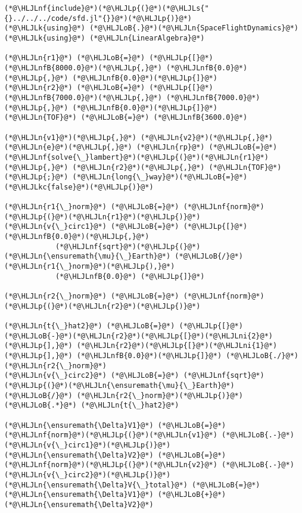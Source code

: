 \documentclass[12pt,a4paper]{article}
\newcommand{\HLJLk}[1]{\textcolor[RGB]{148,91,176}{\textbf{#1}}}
\newcommand{\HLJLkc}[1]{\textcolor[RGB]{59,151,46}{\textit{#1}}}
\newcommand{\HLJLn}[1]{#1}
\newcommand{\HLJLnf}[1]{\textcolor[RGB]{66,102,213}{#1}}
\newcommand{\HLJLs}[1]{\textcolor[RGB]{201,61,57}{#1}}
\newcommand{\HLJLnfB}[1]{\textcolor[RGB]{59,151,46}{#1}}
\newcommand{\HLJLni}[1]{\textcolor[RGB]{59,151,46}{#1}}
\newcommand{\HLJLoB}[1]{\textcolor[RGB]{102,102,102}{\textbf{#1}}}
\newcommand{\HLJLp}[1]{#1}
\begin{document}
\begin{lstlisting}
(*@\HLJLnf{include}@*)(*@\HLJLp{(}@*)(*@\HLJLs{"{}../../../code/sfd.jl"{}}@*)(*@\HLJLp{)}@*)
(*@\HLJLk{using}@*) (*@\HLJLoB{.}@*)(*@\HLJLn{SpaceFlightDynamics}@*)
(*@\HLJLk{using}@*) (*@\HLJLn{LinearAlgebra}@*)

(*@\HLJLn{r1}@*) (*@\HLJLoB{=}@*) (*@\HLJLp{[}@*)(*@\HLJLnfB{8000.0}@*)(*@\HLJLp{,}@*) (*@\HLJLnfB{0.0}@*)(*@\HLJLp{,}@*) (*@\HLJLnfB{0.0}@*)(*@\HLJLp{]}@*)
(*@\HLJLn{r2}@*) (*@\HLJLoB{=}@*) (*@\HLJLp{[}@*)(*@\HLJLnfB{7000.0}@*)(*@\HLJLp{,}@*) (*@\HLJLnfB{7000.0}@*)(*@\HLJLp{,}@*) (*@\HLJLnfB{0.0}@*)(*@\HLJLp{]}@*)
(*@\HLJLn{TOF}@*) (*@\HLJLoB{=}@*) (*@\HLJLnfB{3600.0}@*)

(*@\HLJLn{v1}@*)(*@\HLJLp{,}@*) (*@\HLJLn{v2}@*)(*@\HLJLp{,}@*) (*@\HLJLn{e}@*)(*@\HLJLp{,}@*) (*@\HLJLn{rp}@*) (*@\HLJLoB{=}@*) (*@\HLJLnf{solve{\_}lambert}@*)(*@\HLJLp{(}@*)(*@\HLJLn{r1}@*)(*@\HLJLp{,}@*) (*@\HLJLn{r2}@*)(*@\HLJLp{,}@*) (*@\HLJLn{TOF}@*)(*@\HLJLp{;}@*) (*@\HLJLn{long{\_}way}@*)(*@\HLJLoB{=}@*)(*@\HLJLkc{false}@*)(*@\HLJLp{)}@*)

(*@\HLJLn{r1{\_}norm}@*) (*@\HLJLoB{=}@*) (*@\HLJLnf{norm}@*)(*@\HLJLp{(}@*)(*@\HLJLn{r1}@*)(*@\HLJLp{)}@*)
(*@\HLJLn{v{\_}circ1}@*) (*@\HLJLoB{=}@*) (*@\HLJLp{[}@*) (*@\HLJLnfB{0.0}@*)(*@\HLJLp{,}@*)
            (*@\HLJLnf{sqrt}@*)(*@\HLJLp{(}@*)(*@\HLJLn{\ensuremath{\mu}{\_}Earth}@*) (*@\HLJLoB{/}@*) (*@\HLJLn{r1{\_}norm}@*)(*@\HLJLp{),}@*)
            (*@\HLJLnfB{0.0}@*) (*@\HLJLp{]}@*)

(*@\HLJLn{r2{\_}norm}@*) (*@\HLJLoB{=}@*) (*@\HLJLnf{norm}@*)(*@\HLJLp{(}@*)(*@\HLJLn{r2}@*)(*@\HLJLp{)}@*)

(*@\HLJLn{t{\_}hat2}@*) (*@\HLJLoB{=}@*) (*@\HLJLp{[}@*)(*@\HLJLoB{-}@*)(*@\HLJLn{r2}@*)(*@\HLJLp{[}@*)(*@\HLJLni{2}@*)(*@\HLJLp{],}@*) (*@\HLJLn{r2}@*)(*@\HLJLp{[}@*)(*@\HLJLni{1}@*)(*@\HLJLp{],}@*) (*@\HLJLnfB{0.0}@*)(*@\HLJLp{]}@*) (*@\HLJLoB{./}@*) (*@\HLJLn{r2{\_}norm}@*)
(*@\HLJLn{v{\_}circ2}@*) (*@\HLJLoB{=}@*) (*@\HLJLnf{sqrt}@*)(*@\HLJLp{(}@*)(*@\HLJLn{\ensuremath{\mu}{\_}Earth}@*) (*@\HLJLoB{/}@*) (*@\HLJLn{r2{\_}norm}@*)(*@\HLJLp{)}@*) (*@\HLJLoB{.*}@*) (*@\HLJLn{t{\_}hat2}@*)

(*@\HLJLn{\ensuremath{\Delta}V1}@*) (*@\HLJLoB{=}@*) (*@\HLJLnf{norm}@*)(*@\HLJLp{(}@*)(*@\HLJLn{v1}@*) (*@\HLJLoB{.-}@*) (*@\HLJLn{v{\_}circ1}@*)(*@\HLJLp{)}@*)
(*@\HLJLn{\ensuremath{\Delta}V2}@*) (*@\HLJLoB{=}@*) (*@\HLJLnf{norm}@*)(*@\HLJLp{(}@*)(*@\HLJLn{v2}@*) (*@\HLJLoB{.-}@*) (*@\HLJLn{v{\_}circ2}@*)(*@\HLJLp{)}@*)
(*@\HLJLn{\ensuremath{\Delta}V{\_}total}@*) (*@\HLJLoB{=}@*) (*@\HLJLn{\ensuremath{\Delta}V1}@*) (*@\HLJLoB{+}@*) (*@\HLJLn{\ensuremath{\Delta}V2}@*)


\end{lstlisting}
\end{document}
